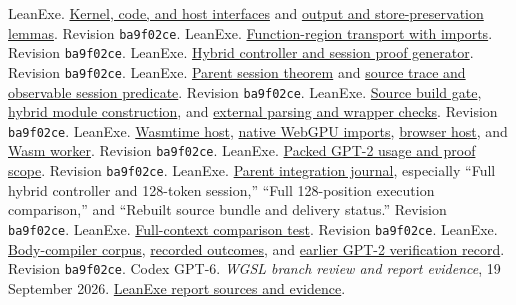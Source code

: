 \documentclass[11pt]{article}
\newcommand{\code}[1]{\texttt{#1}}
\newcommand{\src}[2]{\href{https://github.com/jsmorph/leanexe/blob/ba9f02ce930243a3d35d4d10df6f9c97850ca1e8/#1}{#2}}
\begin{document}
\begin{thebibliography}{19}
 LeanExe.  \src{proofs/talos/lean/Project/Gpt2/PackedBackend.lean}{Kernel, code, and host interfaces} and \src{proofs/talos/lean/Project/Gpt2/PackedCall.lean}{output and store-preservation lemmas}.  Revision \code{ba9f02ce}.
 LeanExe.  \src{proofs/talos/lean/Project/FunctionRegion/Imports.lean}{Function-region transport with imports}.  Revision \code{ba9f02ce}.
 LeanExe.  \src{tools/wgsl/gpt2/packed-compose.js}{Hybrid controller and session proof generator}.  Revision \code{ba9f02ce}.
 LeanExe.  \src{proofs/talos/lean/Project/Gpt2CachedStep/Session/Spec.lean}{Parent session theorem} and \src{proofs/talos/lean/Project/Gpt2CachedStep/Session/State.lean}{source trace and observable session predicate}.  Revision \code{ba9f02ce}.
 LeanExe.  \src{tools/wgsl/gpt2/packed-build.js}{Source build gate}, \src{tools/wgsl/gpt2/packed-module.js}{hybrid module construction}, and \src{tools/wgsl/gpt2/packed-check.js}{external parsing and wrapper checks}.  Revision \code{ba9f02ce}.
 LeanExe.  \src{tools/wasmtime-host.c}{Wasmtime host}, \src{tools/wgsl/gpt2/packed-host.h}{native WebGPU imports}, \src{tools/wgsl/gpt2/packed-browser/host.js}{browser host}, and \src{tools/wgsl/gpt2/packed-browser/worker.js}{Wasm worker}.  Revision \code{ba9f02ce}.
 LeanExe.  \src{docs/wgsl/packed-gpt2.md}{Packed GPT-2 usage and proof scope}.  Revision \code{ba9f02ce}.
 LeanExe.  \src{docs/wgsl/parent-integration-journal.md}{Parent integration journal}, especially ``Full hybrid controller and 128-token session,'' ``Full 128-position execution comparison,'' and ``Rebuilt source bundle and delivery status.''  Revision \code{ba9f02ce}.
 LeanExe.  \src{tools/wgsl/gpt2/packed-session-test.py}{Full-context comparison test}.  Revision \code{ba9f02ce}.
 LeanExe.  \src{tools/wgsl/body-test.js}{Body-compiler corpus}, \src{docs/wgsl/body-compiler.md}{recorded outcomes}, and \src{docs/wgsl/gpt2-verification.md}{earlier GPT-2 verification record}.  Revision \code{ba9f02ce}.
 Codex GPT-6.  \emph{WGSL branch review and report evidence}, 19 September 2026.  \href{https://github.com/jsmorph/leanexe/tree/main/paper/wgsl-verification-report}{LeanExe report sources and evidence}.
\end{thebibliography}
\end{document}
